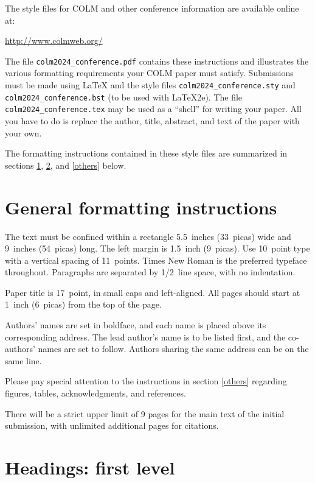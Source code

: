 \documentclass{article} %
\begin{document}
The style files for COLM and other conference information are available online at:
\begin{center}
   \url{http://www.colmweb.org/}
\end{center}
The file \verb+colm2024_conference.pdf+ contains these
instructions and illustrates the
various formatting requirements your COLM paper must satisfy.
Submissions must be made using \LaTeX{} and the style files
\verb+colm2024_conference.sty+ and \verb+colm2024_conference.bst+ (to be used with \LaTeX{}2e). The file
\verb+colm2024_conference.tex+ may be used as a ``shell'' for writing your paper. All you
have to do is replace the author, title, abstract, and text of the paper with
your own.

The formatting instructions contained in these style files are summarized in
sections \ref{gen_inst}, \ref{headings}, and \ref{others} below.

\section{General formatting instructions}
\label{gen_inst}

The text must be confined within a rectangle 5.5~inches (33~picas) wide and
9~inches (54~picas) long. The left margin is 1.5~inch (9~picas).
Use 10~point type with a vertical spacing of 11~points. Times New Roman is the
preferred typeface throughout. Paragraphs are separated by 1/2~line space,
with no indentation.

Paper title is 17~point, in small caps and left-aligned.
All pages should start at 1~inch (6~picas) from the top of the page.

Authors' names are
set in boldface, and each name is placed above its corresponding
address. The lead author's name is to be listed first, and
the co-authors' names are set to follow. Authors sharing the
same address can be on the same line.

Please pay special attention to the instructions in section \ref{others}
regarding figures, tables, acknowledgments, and references.


There will be a strict upper limit of 9 pages for the main text of the initial submission, with unlimited additional pages for citations. 

\section{Headings: first level}
\label{headings}
\end{document}
